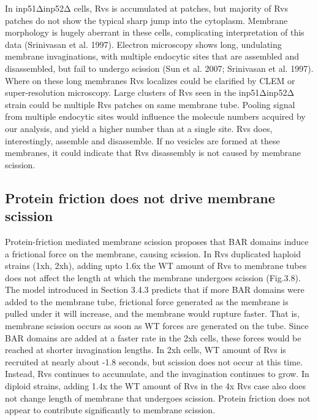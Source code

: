 In inp51Δinp52Δ cells, Rvs is accumulated at patches, but majority of Rvs patches do not show the typical sharp jump into the cytoplasm. Membrane morphology is hugely aberrant in these cells, complicating interpretation of this data (Srinivasan et al. 1997). Electron microscopy shows long, undulating membrane invaginations, with multiple endocytic sites that are assembled and disassembled, but fail to undergo scission (Sun et al. 2007; Srinivasan et al. 1997). Where on these long membranes Rvs localizes could be clarified by CLEM or super-resolution microscopy. Large clusters of Rvs seen in the inp51Δinp52Δ strain could be multiple Rvs patches on same membrane tube. Pooling signal from multiple endocytic sites would influence the molecule numbers acquired by our analysis, and yield a higher number than at a single site. Rvs does, interestingly, assemble and disassemble. If no vesicles are formed at these membranes, it could indicate that Rvs disassembly is not caused by membrane scission.


\subsection{Protein friction does not drive membrane scission}
Protein-friction mediated membrane scission proposes that BAR domains induce a frictional force on the membrane, causing scission. In Rvs duplicated haploid strains (1xh, 2xh), adding upto 1.6x the WT amount of Rvs to membrane tubes does not affect the length at which the membrane undergoes scission (Fig.3.8). The model introduced in Section 3.4.3 predicts that if more BAR domains were added to the membrane tube, frictional force generated as the membrane is pulled under it will increase, and the membrane would rupture faster. That is, membrane scission occurs as soon as WT forces are generated on the tube. Since BAR domains are added at a faster rate in the 2xh cells, these forces would be reached at shorter invagination lengths. In 2xh cells, WT amount of Rvs is recruited at nearly about -1.8 seconds, but scission does not occur at this time. Instead, Rvs continues to accumulate, and the invagination continues to grow. In diploid strains, adding 1.4x the WT amount of Rvs in the 4x Rvs case also does not change length of membrane that undergoes scission. Protein friction does not appear to contribute significantly to membrane scission. 


